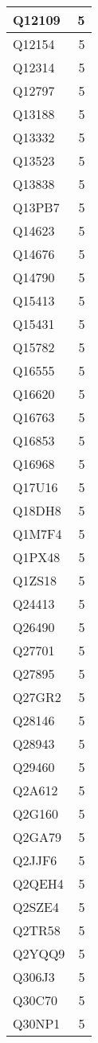 \documentclass[
]{book}
\theoremstyle{definition}
\theoremstyle{definition}
\theoremstyle{definition}
\theoremstyle{definition}
\theoremstyle{remark}
\begin{document}
\begin{table}
\begin{tabular}{l|r}
\hline
Q12109 & 5\\
\hline
Q12154 & 5\\
\hline
Q12314 & 5\\
\hline
Q12797 & 5\\
\hline
Q13188 & 5\\
\hline
Q13332 & 5\\
\hline
Q13523 & 5\\
\hline
Q13838 & 5\\
\hline
Q13PB7 & 5\\
\hline
Q14623 & 5\\
\hline
Q14676 & 5\\
\hline
Q14790 & 5\\
\hline
Q15413 & 5\\
\hline
Q15431 & 5\\
\hline
Q15782 & 5\\
\hline
Q16555 & 5\\
\hline
Q16620 & 5\\
\hline
Q16763 & 5\\
\hline
Q16853 & 5\\
\hline
Q16968 & 5\\
\hline
Q17U16 & 5\\
\hline
Q18DH8 & 5\\
\hline
Q1M7F4 & 5\\
\hline
Q1PX48 & 5\\
\hline
Q1ZS18 & 5\\
\hline
Q24413 & 5\\
\hline
Q26490 & 5\\
\hline
Q27701 & 5\\
\hline
Q27895 & 5\\
\hline
Q27GR2 & 5\\
\hline
Q28146 & 5\\
\hline
Q28943 & 5\\
\hline
Q29460 & 5\\
\hline
Q2A612 & 5\\
\hline
Q2G160 & 5\\
\hline
Q2GA79 & 5\\
\hline
Q2JJF6 & 5\\
\hline
Q2QEH4 & 5\\
\hline
Q2SZE4 & 5\\
\hline
Q2TR58 & 5\\
\hline
Q2YQQ9 & 5\\
\hline
Q306J3 & 5\\
\hline
Q30C70 & 5\\
\hline
Q30NP1 & 5\\

\end{tabular}
\end{table}
\end{document}

